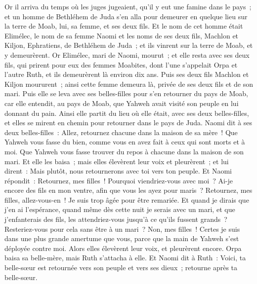 \begin{multicols}{2}
\VerseOne{}Or il arriva du temps où les juges jugeaient, qu'il y eut une famine dans le pays~; et un homme de Bethléhem de Juda s'en alla pour demeurer en quelque lieu sur la terre de Moab, lui, sa femme, et ses deux fils.
Et le nom de cet homme était Elimélec, le nom de sa femme Naomi et les noms de ses deux fils, Machlon et Kiljon, Ephratiens, de Bethléhem de Juda~; et ils vinrent sur la terre de Moab, et y demeurèrent.
Or Elimélec, mari de Naomi, mourut~; et elle resta avec ses deux fils,
qui prirent pour eux des femmes Moabites, dont l'une s'appelait Orpa et l'autre Ruth, et ils demeurèrent là environ dix ans.
Puis ses deux fils Machlon et Kiljon moururent~; ainsi cette femme demeura là, privée de ses deux fils et de son mari.
Puis elle se leva avec ses belles-filles pour s'en retourner du pays de Moab, car elle entendit, au pays de Moab, que Yahweh avait visité son peuple en lui donnant du pain.
Ainsi elle partit du lieu où elle était, avec ses deux belles-filles, et elles se mirent en chemin pour retourner dans le pays de Juda.
Naomi dit à ses deux belles-filles~: Allez, retournez chacune dans la maison de sa mère~! Que Yahweh vous fasse du bien, comme vous en avez fait à ceux qui sont morts et à moi.
Que Yahweh vous fasse trouver du repos à chacune dans la maison de son mari. Et elle les baisa~; mais elles élevèrent leur voix et pleurèrent~;
et lui dirent~: Mais plutôt, nous retournerons avec toi vers ton peuple.
Et Naomi répondit~: Retournez, mes filles~! Pourquoi viendriez-vous avec moi~? Ai-je encore des fils en mon ventre, afin que vous les ayez pour maris~?
Retournez, mes filles, allez-vous-en~! Je suis trop âgée pour être remariée. Et quand je dirais que j'en ai l'espérance, quand même dès cette nuit je serais avec un mari, et que j'enfanterais des fils,
les attendriez-vous jusqu'à ce qu'ils fussent grands~? Resteriez-vous pour cela sans être à un mari~? Non, mes filles~! Certes je suis dans une plus grande amertume que vous, parce que la main de Yahweh s'est déployée contre moi.
Alors elles élevèrent leur voix, et pleurèrent encore. Orpa baisa sa belle-mère, mais Ruth s'attacha à elle.
Et Naomi dit à Ruth~: Voici, ta belle-sœur est retournée vers son peuple et vers ses dieux~; retourne après ta belle-sœur.

\end{multicols}
